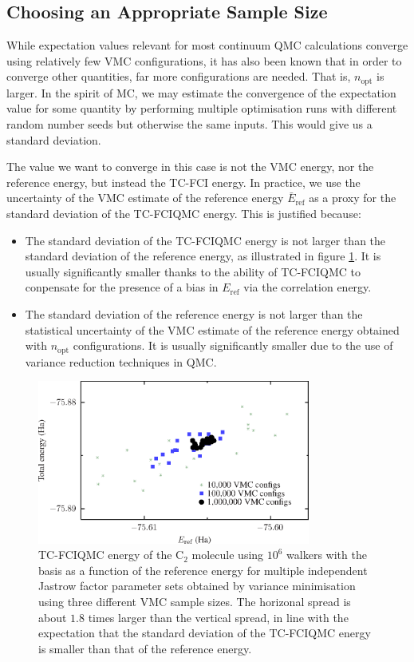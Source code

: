 \subsection{Choosing an Appropriate Sample Size}

While expectation values relevant for most continuum QMC calculations converge using relatively few VMC configurations, it has also been known\supercite{spinkTrion2016} that in order to converge other quantities, far more configurations are needed. That is, $n_\mathrm{opt}$ is larger. In the spirit of \gls{MC}, we may estimate the convergence of the expectation value for some quantity by performing multiple optimisation runs with different random number seeds but otherwise the same inputs. This would give us a standard deviation.

The value we want to converge in this case is not the VMC energy, nor the reference energy, but instead the TC-FCI energy. In practice, we use the uncertainty of the VMC estimate of the reference energy $\bar E_\mathrm{ref}$ as a proxy for the standard deviation of the TC-FCIQMC energy. This is justified because:
\begin{itemize}
    \item The standard deviation of the TC-FCIQMC energy is not larger than the standard deviation of the reference energy, as illustrated in figure \ref{fig:spread_c2_cc-pvdz}. It is usually significantly smaller thanks to the ability of TC-FCIQMC to conpensate for the presence of a bias in $E_\mathrm{ref}$ via the correlation energy.
    \item The standard deviation of the reference energy is not larger than the statistical uncertainty of the VMC estimate of the reference energy obtained with $n_\mathrm{opt}$ configurations. It is usually significantly smaller due to the use of variance reduction techniques in QMC.
\end{itemize}

\begin{figure}[htbp]
    \centering
    \includegraphics[width=0.8\textwidth]{figures/optimisation/Fig/spread_c2_cc-pvdz}
    \caption{TC-FCIQMC energy of the C$_2$ molecule using $10^6$ walkers with the \vdz basis as a function of the reference energy for multiple independent Jastrow factor parameter sets obtained by variance minimisation using three different VMC sample sizes. The horizonal spread is about $1.8$ times larger than the vertical spread, in line with the expectation that the standard deviation of the TC-FCIQMC energy is smaller than that of the reference energy.}
    \label{fig:spread_c2_cc-pvdz}
\end{figure}

